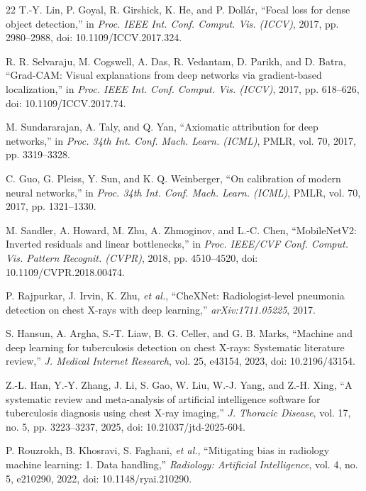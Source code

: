 \documentclass[journal]{IEEEtran}
\begin{document}
\begin{thebibliography}{22}
T.-Y. Lin, P. Goyal, R. Girshick, K. He, and P. Doll\'{a}r, ``Focal loss for
dense object detection,'' in \emph{Proc. IEEE Int. Conf. Comput. Vis. (ICCV)},
2017, pp. 2980--2988, doi: 10.1109/ICCV.2017.324.

R. R. Selvaraju, M. Cogswell, A. Das, R. Vedantam, D. Parikh, and D. Batra,
``Grad-CAM: Visual explanations from deep networks via gradient-based
localization,'' in \emph{Proc. IEEE Int. Conf. Comput. Vis. (ICCV)}, 2017, pp.
618--626, doi: 10.1109/ICCV.2017.74.

M. Sundararajan, A. Taly, and Q. Yan, ``Axiomatic attribution for deep
networks,'' in \emph{Proc. 34th Int. Conf. Mach. Learn. (ICML)}, PMLR, vol. 70,
2017, pp. 3319--3328.

C. Guo, G. Pleiss, Y. Sun, and K. Q. Weinberger, ``On calibration of modern
neural networks,'' in \emph{Proc. 34th Int. Conf. Mach. Learn. (ICML)}, PMLR,
vol. 70, 2017, pp. 1321--1330.

M. Sandler, A. Howard, M. Zhu, A. Zhmoginov, and L.-C. Chen, ``MobileNetV2:
Inverted residuals and linear bottlenecks,'' in \emph{Proc. IEEE/CVF Conf.
Comput. Vis. Pattern Recognit. (CVPR)}, 2018, pp. 4510--4520, doi:
10.1109/CVPR.2018.00474.

P. Rajpurkar, J. Irvin, K. Zhu, \emph{et al.}, ``CheXNet: Radiologist-level
pneumonia detection on chest X-rays with deep learning,''
\emph{arXiv:1711.05225}, 2017.

S. Hansun, A. Argha, S.-T. Liaw, B. G. Celler, and G. B. Marks, ``Machine and
deep learning for tuberculosis detection on chest X-rays: Systematic literature
review,'' \emph{J. Medical Internet Research}, vol. 25, e43154, 2023, doi:
10.2196/43154.

Z.-L. Han, Y.-Y. Zhang, J. Li, S. Gao, W. Liu, W.-J. Yang, and Z.-H. Xing, ``A
systematic review and meta-analysis of artificial intelligence software for
tuberculosis diagnosis using chest X-ray imaging,'' \emph{J. Thoracic Disease},
vol. 17, no. 5, pp. 3223--3237, 2025, doi: 10.21037/jtd-2025-604.

P. Rouzrokh, B. Khosravi, S. Faghani, \emph{et al.}, ``Mitigating bias in
radiology machine learning: 1. Data handling,'' \emph{Radiology: Artificial
Intelligence}, vol. 4, no. 5, e210290, 2022, doi: 10.1148/ryai.210290.


\end{thebibliography}
\end{document}
